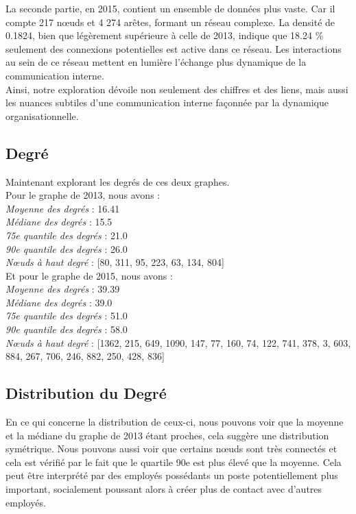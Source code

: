 \documentclass{article}
\begin{document}
La seconde partie, en 2015, contient un ensemble de données plus vaste. Car il compte 217 nœuds et 4 274 arêtes, formant un réseau complexe. La densité de 0.1824, bien que légèrement supérieure à celle de 2013, indique que 18.24 \% seulement des connexions potentielles est active dans ce réseau. Les interactions au sein de ce réseau mettent en lumière l’échange plus dynamique de la communication interne. \\

Ainsi, notre exploration dévoile non seulement des chiffres et des liens, mais aussi les nuances subtiles d'une communication interne façonnée par la dynamique organisationnelle.

\subsection{Degré}

\noindent
Maintenant explorant les degrés de ces deux graphes. \\

\noindent
Pour le graphe de 2013, nous avons : \\
\textit{Moyenne des degrés} : 16.41 \\
\textit{Médiane des degrés} : 15.5 \\
\textit{75e quantile des degrés} : 21.0 \\
\textit{90e quantile des degrés} : 26.0 \\
\textit{Nœuds à haut degré} : [80, 311, 95, 223, 63, 134, 804] \\

\noindent
Et pour le graphe de 2015, nous avons :  \\
\textit{Moyenne des degrés} : 39.39 \\
\textit{Médiane des degrés} : 39.0 \\
\textit{75e quantile des degrés} : 51.0 \\
\textit{90e quantile des degrés} : 58.0 \\
\textit{Nœuds à haut degré} : [1362, 215, 649, 1090, 147, 77, 160, 74, 122, 741, 378, 3, 603, 884, 267, 706, 246, 882, 250, 428, 836]

\subsection{Distribution du Degré}

En ce qui concerne la distribution de ceux-ci, nous pouvons voir que la moyenne et la médiane du graphe de 2013 étant proches, cela suggère une distribution symétrique.
Nous pouvons aussi voir que certains nœuds sont très connectés et cela est vérifié par le fait que le quartile 90e est plus élevé que la moyenne. Cela peut être interprété par des employés possédants un poste potentiellement plus important, socialement poussant alors à créer plus de contact avec d’autres employés. \\
\end{document}
